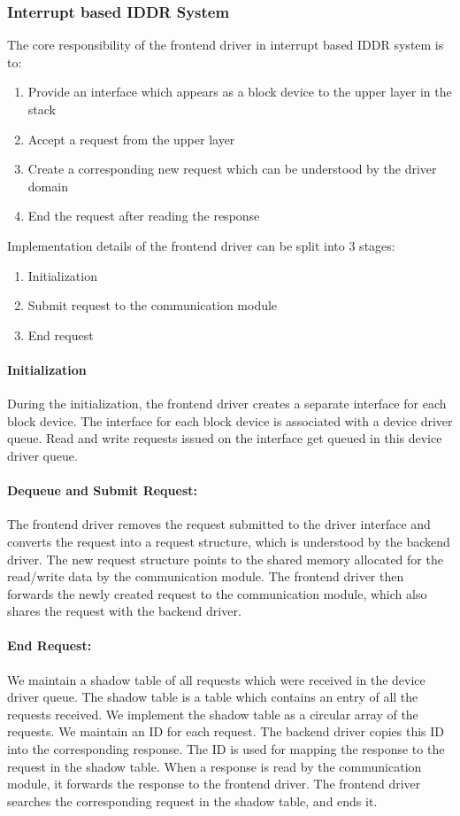\subsubsection*{Interrupt based IDDR System}
The core responsibility of the frontend driver in interrupt based IDDR system is to:
\begin{enumerate}
\item Provide an interface which appears as a block device to the upper layer in the stack
\item Accept a request from the upper layer
\item Create a corresponding new request which can be understood by the driver domain
\item End the request after reading the response
\end{enumerate}

Implementation details of the frontend driver can be split into 3 stages: 
\begin{enumerate}
\item Initialization
\item Submit request to the communication module
\item End request
\end{enumerate}

\paragraph{Initialization}
During the initialization, the frontend driver creates a separate interface for each block device. The interface for each block device is associated with a device driver queue. Read and write requests issued on the interface get queued in this device driver queue.

\paragraph{Dequeue and Submit Request:}
The frontend driver removes the request submitted to the driver interface and converts the request into a request structure, which is understood by the backend driver. The new request structure points to the shared memory allocated for the read/write data by the communication module. The frontend driver then forwards the newly created request to the communication module, which also shares the request with the backend driver.

\paragraph{End Request:}
We maintain a shadow table of all requests which were received in the device driver queue. The shadow table is a table which contains an entry of all the requests received. We implement the shadow table as a circular array of the requests. We maintain an ID for each request. The backend driver copies this ID into the corresponding response. The ID is used for mapping the response to the request in the shadow table. When a response is read by the communication module, it forwards the response to the frontend driver. The frontend driver searches the corresponding request in the shadow table, and ends it. 

